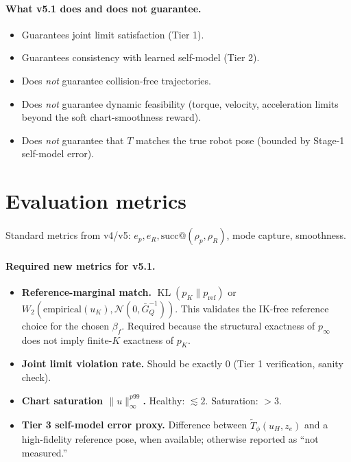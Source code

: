 \documentclass[11pt,a4paper]{article}
\DeclareMathOperator{\KL}{KL}
\newcommand{\N}{\mathcal{N}}
\newcommand{\GQbar}{\bar G_Q}
\begin{document}
\paragraph{What v5.1 does and does not guarantee.}
\begin{itemize}[noitemsep]
    \item Guarantees joint limit satisfaction (Tier 1).
    \item Guarantees consistency with learned self-model (Tier 2).
    \item Does \emph{not} guarantee collision-free trajectories.
    \item Does \emph{not} guarantee dynamic feasibility (torque, velocity, acceleration limits beyond the soft chart-smoothness reward).
    \item Does \emph{not} guarantee that $T$ matches the true robot pose (bounded by Stage-1 self-model error).
\end{itemize}

\section{Evaluation metrics}
\label{sec:eval}

Standard metrics from v4/v5: $e_p, e_R, \text{succ}@(\rho_p, \rho_R)$, mode capture, smoothness.

\paragraph{Required new metrics for v5.1.}
\begin{itemize}[noitemsep]
    \item \textbf{Reference-marginal match.} $\KL(p_K \| p_\text{ref})$ or $W_2(\text{empirical}(u_K), \N(0, \GQbar^{-1}))$. This validates the IK-free reference choice for the chosen $\beta_f$. Required because the structural exactness of $p_\infty$ does not imply finite-$K$ exactness of $p_K$.
    \item \textbf{Joint limit violation rate.} Should be exactly $0$ (Tier 1 verification, sanity check).
    \item \textbf{Chart saturation $\|u\|_\infty^{p99}$.} Healthy: $\lesssim 2$. Saturation: $> 3$.
    \item \textbf{Tier 3 self-model error proxy.} Difference between $\widetilde T_\phi(u_H, z_e)$ and a high-fidelity reference pose, when available; otherwise reported as ``not measured.''
\end{itemize}
\end{document}
